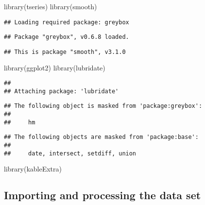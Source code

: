 \documentclass[
]{article}
\newenvironment{Shaded}{\begin{snugshade}}{\end{snugshade}}
\newcommand{\FunctionTok}[1]{\textcolor[rgb]{0.00,0.00,0.00}{#1}}
\newcommand{\NormalTok}[1]{#1}
\begin{document}
\begin{Shaded}
\begin{Highlighting}[]
\FunctionTok{library}\NormalTok{(tseries)}
\FunctionTok{library}\NormalTok{(smooth)}
\end{Highlighting}
\end{Shaded}

\begin{verbatim}
## Loading required package: greybox
\end{verbatim}

\begin{verbatim}
## Package "greybox", v0.6.8 loaded.
\end{verbatim}

\begin{verbatim}
## This is package "smooth", v3.1.0
\end{verbatim}

\begin{Shaded}
\begin{Highlighting}[]
\FunctionTok{library}\NormalTok{(ggplot2)}
\FunctionTok{library}\NormalTok{(lubridate)}
\end{Highlighting}
\end{Shaded}

\begin{verbatim}
## 
## Attaching package: 'lubridate'
\end{verbatim}

\begin{verbatim}
## The following object is masked from 'package:greybox':
## 
##     hm
\end{verbatim}

\begin{verbatim}
## The following objects are masked from 'package:base':
## 
##     date, intersect, setdiff, union
\end{verbatim}

\begin{Shaded}
\begin{Highlighting}[]
\FunctionTok{library}\NormalTok{(kableExtra)}
\end{Highlighting}
\end{Shaded}

\hypertarget{importing-and-processing-the-data-set}{%
\subsection{Importing and processing the data
set}\label{importing-and-processing-the-data-set}}
\end{document}
